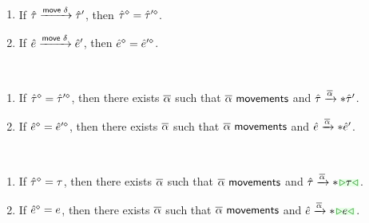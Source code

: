 \documentclass{article}
\begin{document}
%
\begin{mathpar}

\end{mathpar}

\judgbox{\ensuremath{\movements{\AIMV}}}
%
\begin{mathpar}

\end{mathpar}

\begin{theorem}[name=Sensibility]
\end{theorem}

\begin{theorem}[name=Movement Erasure Invariance] \
  \begin{enumerate}
    \item If $\ATAction{\ZTMV}{\ZTMV'}{\AMove{\MMV}}$, then $\cursorErase{\ZTMV} =
      \cursorErase{\ZTMV'}$.

    \item If $\AEAction{\ZMV}{\ZMV'}{\AMove{\MMV}}$, then $\cursorErase{\ZMV} =
      \cursorErase{\ZMV'}$.
  \end{enumerate}
\end{theorem}

\begin{theorem}[name=Reachability] \
  \begin{enumerate}
    \item If $\cursorErase{\ZTMV} = \cursorErase{\ZTMV'}$, then there exists $\AIMV$ such that
      $\movements{\AIMV}$ and $\ATActionIter{\ZTMV}{\ZTMV'}{\AIMV}$.

    \item If $\cursorErase{\ZMV} = \cursorErase{\ZMV'}$, then there exists $\AIMV$ such that
      $\movements{\AIMV}$ and $\AEActionIter{\ZMV}{\ZMV'}{\AIMV}$.
  \end{enumerate}
\end{theorem}

\begin{lemma}[name=Reach Up] \
  \begin{enumerate}
    \item If $\cursorErase{\ZTMV} = \TMV$, then there exists $\AIMV$ such that $\movements{\AIMV}$
      and $\ATActionIter{\ZTMV}{\ZTCursor{\TMV}}{\AIMV}$.

    \item If $\cursorErase{\ZMV} = \EMV$, then there exists $\AIMV$ such that $\movements{\AIMV}$
      and $\AEActionIter{\ZMV}{\ZTCursor{\EMV}}{\AIMV}$.
  \end{enumerate}
\end{lemma}
\end{document}
